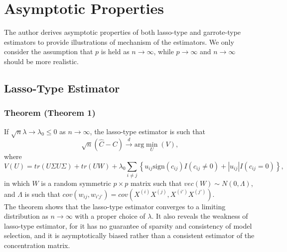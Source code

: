 \documentclass[11pt]{article} %
\begin{document}
\section{Asymptotic Properties}
The author derives asymptotic properties of both lasso-type and garrote-type estimators to provide illustrations of mechanism of the estimators. We only consider the assumption that $p$ is held as $n\rightarrow \infty$, while $p\rightarrow \infty$ and $n\rightarrow \infty$ should be more realistic. 

\subsection{Lasso-Type Estimator}
\subsubsection{Theorem (Theorem 1)}
If $\sqrt{n} \lambda \rightarrow \lambda_0 \leq 0$ as $n\rightarrow \infty$, the lasso-type estimator is such that 
\[\sqrt{n} \left( \hat{C} - C\right) \stackrel{d}{\rightarrow} \mbox{arg} \min_U \left( V\right) \mbox{,} \] 
where
\[V(U)=tr(U\Sigma U\Sigma )+tr(UW)+\lambda_0 \sum_{i\neq j}\left\lbrace u_{ij} \mbox{sign} (c_{ij})I(c_{ij}\neq 0)+|u_{ij}| I(c_{ij} =0) \right\rbrace \mbox{,}\]
in which $W$ is a random symmetric $p\times p$ matrix such that $vec(W)\sim N(0, \Lambda)$, and $\Lambda$ is such that $cov(w_{ij},w_{i'j'})=cov(X^{(i)}X^{(j)},X^{(i')}X^{(j')})$. \\

The theorem shows that the lasso-type estimator converges to a limiting distribution as $n\rightarrow \infty$ with a proper choice of $\lambda$. It also reveals the weakness of lasso-type estimator, for it has no guarantee of sparsity and consistency of model selection, and it is asymptotically biased rather than a consistent estimator of the concentration matrix.
\end{document}
